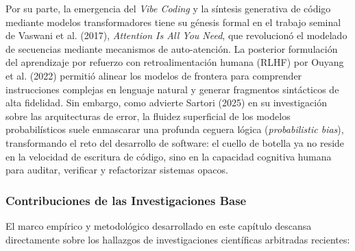 Por su parte, la emergencia del \textit{Vibe Coding} y la síntesis generativa de código mediante modelos transformadores tiene su génesis formal en el trabajo seminal de Vaswani et al. (2017), \textit{Attention Is All You Need}, que revolucionó el modelado de secuencias mediante mecanismos de auto-atención. La posterior formulación del aprendizaje por refuerzo con retroalimentación humana (RLHF) por Ouyang et al. (2022) permitió alinear los modelos de frontera para comprender instrucciones complejas en lenguaje natural y generar fragmentos sintácticos de alta fidelidad. Sin embargo, como advierte Sartori (2025) en su investigación sobre las arquitecturas de error, la fluidez superficial de los modelos probabilísticos suele enmascarar una profunda ceguera lógica (\textit{probabilistic bias}), transformando el reto del desarrollo de software: el cuello de botella ya no reside en la velocidad de escritura de código, sino en la capacidad cognitiva humana para auditar, verificar y refactorizar sistemas opacos.

\subsubsection*{Contribuciones de las Investigaciones Base}

El marco empírico y metodológico desarrollado en este capítulo descansa directamente sobre los hallazgos de investigaciones científicas arbitradas recientes:


